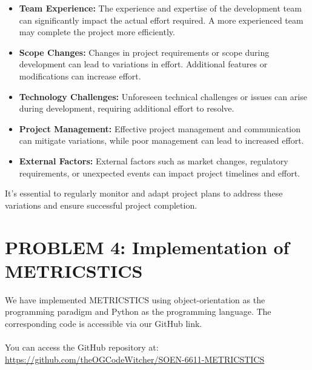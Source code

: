 \documentclass[runningheads]{llncs}
\begin{document}
\begin{itemize}
    \item \textbf {Team Experience:} The experience and expertise of the development team can significantly impact the actual effort required. A more experienced team may complete the project more efficiently.
    \item\textbf {Scope Changes:} Changes in project requirements or scope during development can lead to variations in effort. Additional features or modifications can increase effort.
    \item \textbf {Technology Challenges:} Unforeseen technical challenges or issues can arise during development, requiring additional effort to resolve.
    \item\textbf{Project Management:} Effective project management and communication can mitigate variations, while poor management can lead to increased effort.
    \item \textbf{External Factors:} External factors such as market changes, regulatory requirements, or unexpected events can impact project timelines and effort.
\end{itemize}

It's essential to regularly monitor and adapt project plans to address these variations and ensure successful project completion.

\section{PROBLEM 4: Implementation of METRICSTICS}
We have implemented METRICSTICS using object-orientation as the programming paradigm and Python as the programming language. The corresponding code is accessible via our GitHub link.\\
\\
You can access the GitHub repository at:\\
\href{https://github.com/theOGCodeWitcher/SOEN-6611-METRICSTICS}{https://github.com/theOGCodeWitcher/SOEN-6611-METRICSTICS}\\
\\
\end{document}
